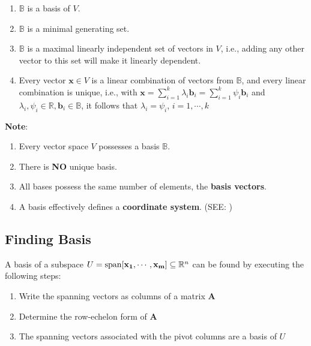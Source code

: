 \begin{enumerate}
    \item $\mathbb{B}$ is a basis of $V$.
    
    \item $\mathbb{B}$ is a minimal generating set.
    
    \item $\mathbb{B}$ is a maximal linearly independent set of vectors in $V$, i.e., adding any other vector to this set will make it linearly dependent.

    \item Every vector $\mathbf{x} \in V$ is a linear combination of vectors from $\mathbb{B}$, and every linear combination is unique, i.e., with \( \displaystyle \mathbf{x} = \sum_{i=1}^{k} \lambda_i \mathbf{b}_i = \sum_{i=1}^{k} \psi_i \mathbf{b}_i \) and $\lambda_i, \psi_i \in \mathbb{R}, \mathbf{b}_i \in \mathbb{B}$, it follows that $\lambda_i = \psi_i$, $i=1,\cdots,k$

    
\end{enumerate}

\vspace{0.2cm}
\textbf{Note}:
\begin{enumerate}
    \item Every vector space $V$ possesses a basis $\mathbb{B}$. 
    
    \item There is \textbf{NO} unique basis. 
    
    \item All bases possess the same number of elements, the \textbf{basis vectors}.

    \item A basis effectively defines a \textbf{coordinate system}. (SEE: )
\end{enumerate}

\subsection{Finding Basis \cite{mfml-1}}
A basis of a subspace $U = \operatorname{span}[\mathbf{x_1, \cdots, x_m}] \subseteq \mathbb{R}^n$ can be found by executing the following steps:
\begin{enumerate}
    \item Write the spanning vectors as columns of a matrix $\mathbf{A}$
    \item Determine the row-echelon form of $\mathbf{A}$
    \item The spanning vectors associated with the pivot columns are a basis of $U$
\end{enumerate}


